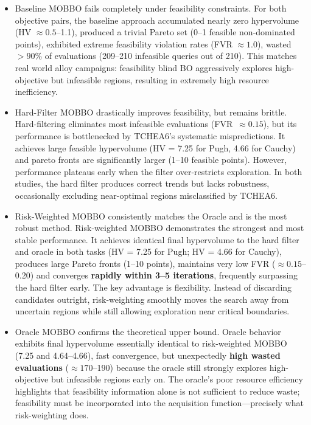 \documentclass[letterpaper,4pt,times,preprint]{elsarticle}
\begin{document}
\begin{itemize}

\item Baseline MOBBO fails completely under feasibility constraints. For both objective pairs, the baseline approach accumulated nearly zero hypervolume (HV $\approx 0.5$--1.1), produced a trivial Pareto set (0--1 feasible non-dominated points), exhibited extreme feasibility violation rates (FVR $\approx 1.0$), wasted $>90\%$ of evaluations (209--210 infeasible queries out of 210).
This matches real world alloy campaigns: feasibility blind BO aggressively explores high-objective but infeasible regions, resulting in extremely high resource inefficiency.

\item Hard-Filter MOBBO drastically improves feasibility, but remains brittle.
Hard-filtering eliminates most infeasible evaluations (FVR~$\approx 0.15$), but its performance is bottlenecked by TCHEA6’s systematic mispredictions. It achieves large feasible hypervolume (HV = 7.25 for Pugh, 4.66 for Cauchy) and pareto fronts are significantly larger (1--10 feasible points). However, performance plateaus early when the filter over-restricts exploration.
In both studies, the hard filter produces correct trends but lacks robustness, occasionally excluding near-optimal regions misclassified by TCHEA6.

\item Risk-Weighted MOBBO consistently matches the Oracle and is the most robust method. 
Risk-weighted MOBBO demonstrates the strongest and most stable performance. It achieves identical final hypervolume to the hard filter and oracle in both tasks (HV = 7.25 for Pugh; HV = 4.66 for Cauchy), produces large Pareto fronts (1--10 points), maintains very low FVR ($\approx 0.15$--0.20) and converges \textbf{rapidly within 3--5 iterations}, frequently surpassing the hard filter early.
The key advantage is flexibility. Instead of discarding candidates outright, risk-weighting smoothly moves the search away from uncertain regions while still allowing exploration near critical boundaries.

\item Oracle MOBBO confirms the theoretical upper bound. 
Oracle behavior exhibits final hypervolume essentially identical to risk-weighted MOBBO (7.25 and 4.64--4.66), fast convergence, but unexpectedly \textbf{high wasted evaluations} ($\approx 170$--190) because the oracle still strongly explores high-objective but infeasible regions early on.
The oracle’s poor resource efficiency highlights that feasibility information alone is not sufficient to reduce waste; feasibility must be incorporated into the acquisition function—precisely what risk-weighting does.

\end{itemize}
\end{document}
